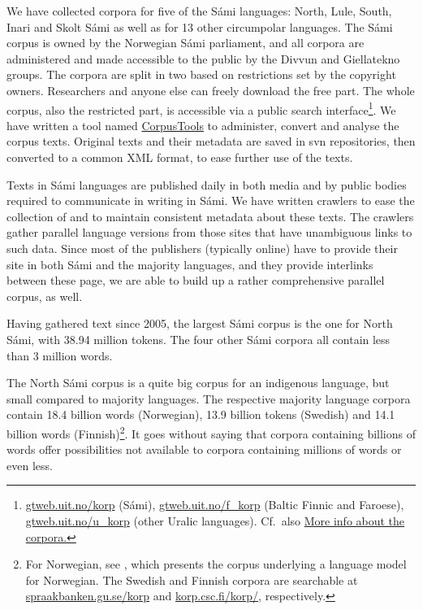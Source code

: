 \documentclass[free]{flammie}
\begin{document}
We have collected corpora for five of the Sámi languages: North, Lule, South,
Inari and Skolt Sámi as well as for 13 other circumpolar languages. The Sámi
corpus is owned by the Norwegian Sámi parliament, and all corpora are
administered and made accessible to the public by the Divvun and Giellatekno
groups.  The corpora are split in two based on restrictions set by the copyright
owners. Researchers and anyone else can freely download the free part. The whole
corpus, also the restricted part, is accessible via a public search
interface\footnote{\href{https://gtweb.uit.no/korp}{gtweb.uit.no/korp} (Sámi),
\href{https://gtweb.uit.no/f_korp}{gtweb.uit.no/f\_korp} (Baltic Finnic and
Faroese), \href{https://gtweb.uit.no/u_korp}{gtweb.uit.no/u\_korp} (other Uralic
languages). Cf.\ also
\href{https://giellalt.github.io/ling/corpus_repositories.html}{More info about
the corpora.}}.  We have written a tool named
\href{https://github.com/giellalt/CorpusTools}{CorpusTools} to administer,
convert and analyse the corpus texts. Original texts and their metadata are
saved in svn repositories, then converted to a common XML format, to ease
further use of the texts.



Texts in Sámi languages are published daily in both media and by public bodies
required to communicate in writing in Sámi. We have written crawlers to ease the
collection of and to maintain consistent metadata about these texts. The
crawlers gather parallel language versions from those sites that have
unambiguous links to such data. Since most of the publishers (typically online)
have to provide their site in both Sámi and the majority languages, and they
provide interlinks between these page, we are able to build up a rather
comprehensive parallel corpus, as well.

Having gathered text since 2005, the largest Sámi corpus is the one for North
Sámi, with 38.94 million tokens. The four other Sámi corpora all contain less
than 3 million words.

The North Sámi corpus is a quite big corpus for an indigenous language, but
small compared to majority languages. The respective majority language corpora
contain 18.4 billion words (Norwegian), 13.9 billion tokens (Swedish) and 14.1
billion words (Finnish)\footnote{For Norwegian, see
\cite{kummervold-etal-2021-operationalizing}, which presents the corpus
underlying a language model for Norwegian. The Swedish and Finnish corpora are
searchable at \href{https://spraakbanken.gu.se/korp}{spraakbanken.gu.se/korp}
and \href{https://korp.csc.fi/korp/}{korp.csc.fi/korp/}, respectively.}.  It
goes without saying that corpora containing billions of words offer
possibilities not available to corpora containing millions of words or even
less.
\end{document}
